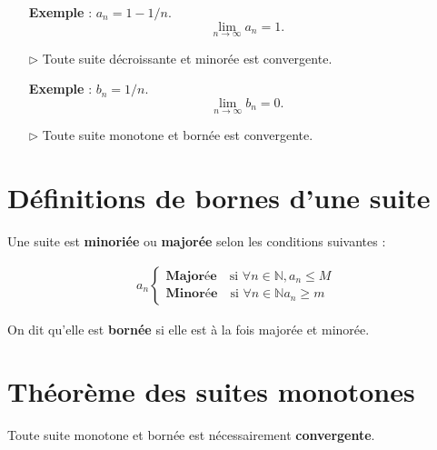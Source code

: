\documentclass{report}
\begin{document}
\begin{multicols*}{3}
\begin{itemize}
            \textbf{Exemple} : \( a_n = 1 - 1/n \). 
        \[
        \lim_{n \to \infty} a_n = 1.
        \]
        
        \item[$\rhd$] Toute suite décroissante et minorée est convergente. 

            \textbf{Exemple} : \( b_n = 1/n \).
        \[
        \lim_{n \to \infty} b_n = 0.
        \]
        
        \item[$\rhd$] Toute suite monotone et bornée est convergente.
    \end{itemize}


     \section{Définitions de bornes d'une suite} 
     Une suite  est \textbf{minoriée} ou 
     \textbf{majorée} selon les conditions suivantes :

     \begin{align*}
        a_n 
        \begin{cases} 
            \textbf{Majorée} \quad \text{si } \forall n \in \mathbb{N}, a_n \leq M 
            \\ 
            \textbf{Minorée} \quad \text{si } \forall n \in \mathbb{N} a_n \geq m  
        \end{cases}
     \end{align*}

     
     On dit qu'elle est \textcolor{myr}{\textbf{bornée}} si elle est à la fois  
     majorée et minorée.
     \vspace{0.25em}

     \section{Théorème des suites monotones}
        Toute suite monotone et bornée est nécessairement \textbf{convergente}.  

    \begin{center}
\end{center}
\end{multicols*}
\end{document}
